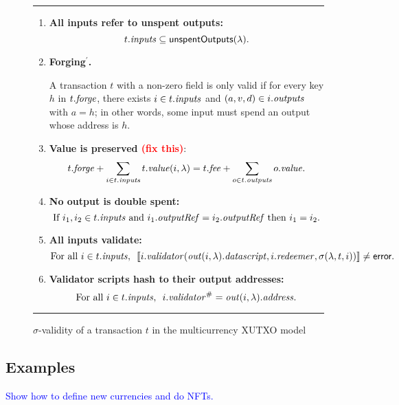\documentclass[a4paper]{article}
\newcommand{\red}[1]{\textcolor{red}{#1}}
\newcommand{\blue}[1]{\textcolor{blue}{#1}}
\theoremstyle{definition}  %
\newenvironment{ruledfigure}[1]{\begin{figure}[#1]\hrule\vspace{10pt}}{\vspace{10pt}\hrule\end{figure}}
\begin{document}
\begin{ruledfigure}{H}
  \begin{enumerate}
    \item \label{all-inputs-refer-to-unspent-outputs-2} \textbf{All
      inputs refer to unspent outputs:}
      \[
        t.\mathit{inputs} \subseteq \mathsf{unspentOutputs}(\lambda).
      \]
    \item\label{forging-2} \textbf{Forging$^{\prime}$.}
      \begin{center}
        \parbox{0.8\textwidth}{
          A transaction $t$ with a non-zero \forge{} field is only valid if for
          every key $h$ in $t.\mathit{forge}$, there exists $i \in t.\mathit{inputs}$
          and $(a,v,d) \in i.\mathit{outputs}$ with $a =h$; in other words, some input
          must spend an output whose address is $h$.
          }
      
      \end{center}
    \item \label{value-is-preserved-2} \textbf{Value is preserved \red{(fix this)}}:
    \[
      t.\mathit{forge} + \sum_{i \in t.\mathit{inputs}} t.\mathit{value}(i, \lambda) = t.\mathit{fee} + \sum_{o \in t.\mathit{outputs}} o.\mathit{value}.
    \]
    \item \label{no-double-spending-2} \textbf{No output is double spent:}
    \[
     \textrm{If } i_1, i_2 \in t.\mathit{inputs} \textrm{ and }  i_1.\mathit{outputRef} = i_2.\mathit{outputRef}
     \textrm{ then } i_1 = i_2.
    \]
    \item\label{all-inputs-validate-2} \textbf{All inputs validate:}
    \[
    \textrm{For all } i \in t.\mathit{inputs},\enspace \llbracket
    i.\mathit{validator}(\mathit{out}(i,
    \lambda).\mathit{datascript},i.\mathit{redeemer}, \sigma(\lambda, t, i))
    \rrbracket \ne \textsf{error}.
      \]
    \item\label{validator-scripts-hash-2} \textbf{Validator scripts hash to their output addresses:}
    \[
      \textrm{For all } i \in t.\mathit{inputs},\enspace i.\mathit{validator}^{\#} = \mathit{out}(i, \lambda).\mathit{address}.
    \]
  \end{enumerate}
  \caption{$\sigma$-validity of a transaction $t$ in the multicurrency XUTXO model}

\end{ruledfigure}


\subsection{Examples}
\blue{Show how to define new currencies and do NFTs.}
\end{document}

